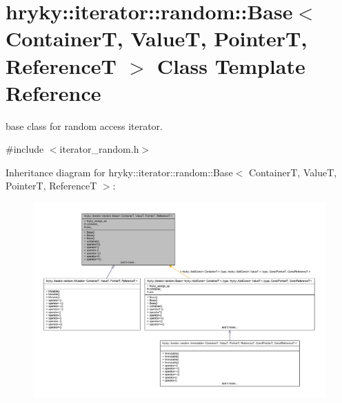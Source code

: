 \hypertarget{classhryky_1_1iterator_1_1random_1_1_base}{\section{hryky\-:\-:iterator\-:\-:random\-:\-:Base$<$ Container\-T, Value\-T, Pointer\-T, Reference\-T $>$ Class Template Reference}
\label{classhryky_1_1iterator_1_1random_1_1_base}
}


base class for random access iterator.  




{\ttfamily \#include $<$iterator\-\_\-random.\-h$>$}



Inheritance diagram for hryky\-:\-:iterator\-:\-:random\-:\-:Base$<$ Container\-T, Value\-T, Pointer\-T, Reference\-T $>$\-:
\nopagebreak
\begin{figure}[H]
\begin{center}
\leavevmode
\includegraphics[width=350pt]{classhryky_1_1iterator_1_1random_1_1_base__inherit__graph}
\end{center}
\end{figure}
